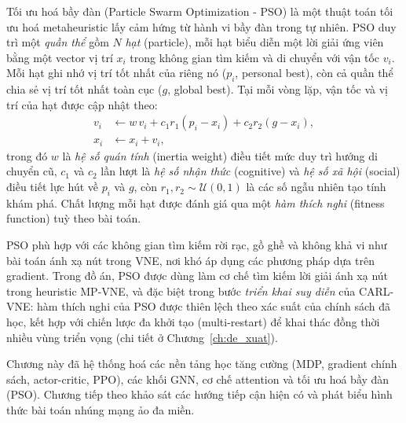 \documentclass[../DoAn.tex]{subfiles}
\begin{document}
Tối ưu hoá bầy đàn (Particle Swarm Optimization - PSO)\cite{kennedy1995pso} là một thuật toán tối ưu hoá metaheuristic lấy cảm hứng từ hành vi bầy đàn trong tự nhiên. PSO duy trì một \textit{quần thể} gồm $N$ \textit{hạt} (particle), mỗi hạt biểu diễn một lời giải ứng viên bằng một vector vị trí $x_i$ trong không gian tìm kiếm và di chuyển với vận tốc $v_i$. Mỗi hạt ghi nhớ vị trí tốt nhất của riêng nó ($p_i$, personal best), còn cả quần thể chia sẻ vị trí tốt nhất toàn cục ($g$, global best). Tại mỗi vòng lặp, vận tốc và vị trí của hạt được cập nhật theo:
\begin{align}
    v_i &\leftarrow w\,v_i + c_1 r_1 (p_i - x_i) + c_2 r_2 (g - x_i), \label{eq:pso-vel}\\
    x_i &\leftarrow x_i + v_i, \label{eq:pso-pos}
\end{align}
trong đó $w$ là \textit{hệ số quán tính} (inertia weight)\cite{shi1998modified} điều tiết mức duy trì hướng di chuyển cũ, $c_1$ và $c_2$ lần lượt là \textit{hệ số nhận thức} (cognitive) và \textit{hệ số xã hội} (social) điều tiết lực hút về $p_i$ và $g$, còn $r_1, r_2 \sim \mathcal{U}(0,1)$ là các số ngẫu nhiên tạo tính khám phá. Chất lượng mỗi hạt được đánh giá qua một \textit{hàm thích nghi} (fitness function) tuỳ theo bài toán.

PSO phù hợp với các không gian tìm kiếm rời rạc, gồ ghề và không khả vi như bài toán ánh xạ nút trong VNE, nơi khó áp dụng các phương pháp dựa trên gradient. Trong đồ án, PSO được dùng làm cơ chế tìm kiếm lời giải ánh xạ nút trong heuristic MP-VNE, và đặc biệt trong bước \textit{triển khai suy diễn} của CARL-VNE: hàm thích nghi của PSO được thiên lệch theo xác suất của chính sách đã học, kết hợp với chiến lược đa khởi tạo (multi-restart) để khai thác đồng thời nhiều vùng triển vọng (chi tiết ở Chương~\ref{ch:de_xuat}).

Chương này đã hệ thống hoá các nền tảng học tăng cường (MDP, gradient chính sách, actor-critic, PPO), các khối GNN, cơ chế attention và tối ưu hoá bầy đàn (PSO). Chương tiếp theo khảo sát các hướng tiếp cận hiện có và phát biểu hình thức bài toán nhúng mạng ảo đa miền.
\end{document}
